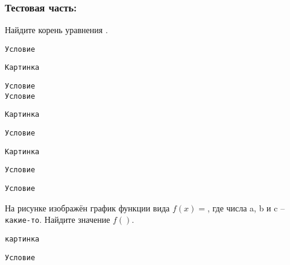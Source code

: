 \documentclass[12pt]{article}
\begin{document}
\begin{landscape}
\begin{multicols}{2}
\subsubsection*{Тестовая часть:}
\noindent{} Найдите корень уравнения . \\


\noindent{} \vspace{30mm}

\noindent{} \texttt{Условие}
\vspace{10mm}
\begin{center}
    \texttt{Картинка}
    \vspace{20mm}
\end{center}


\noindent{} \texttt{Условие}\\


\noindent{} \texttt{Условие}\\
\vspace{20mm}
\begin{center}
    \texttt{Картинка}
    \vspace{20mm}
\end{center}
\noindent{} \texttt{Условие}

\columnbreak

\begin{center}
    \texttt{Картинка}
    \vspace{30mm}
\end{center}
\noindent{} \texttt{Условие}\\
    \vspace{35mm}


\noindent{} \texttt{Условие}\\
    \vspace{25mm}

\noindent{} На рисунке изображён график функции вида $f(x) = $, где числа a, b и c -- \texttt{какие-то}. Найдите значение $f(  )$.
\begin{center}
    \texttt{картинка}
    \vspace{30mm}
\end{center}
\noindent{} \texttt{Условие}

\end{multicols}
\end{landscape}
\newpage
\end{document}
